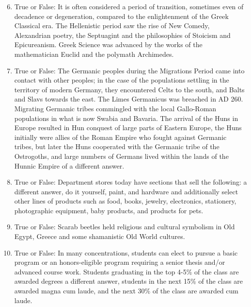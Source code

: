 \documentclass[12pt]{article}
\begin{document}
\begin{enumerate}[label=\arabic*.]
\setcounter{enumi}{5}
\item True or False: It is often considered a period of transition, sometimes even of decadence or degeneration, compared to the enlightenment of the Greek Classical era. The Hellenistic period saw the rise of New Comedy, Alexandrian poetry, the Septuagint and the philosophies of Stoicism and Epicureanism. Greek Science was advanced by the works of the mathematician Euclid and the polymath Archimedes.
\item True or False: The Germanic peoples during the Migrations Period came into contact with other peoples; in the case of the populations settling in the territory of modern Germany, they encountered Celts to the south, and Balts and Slavs towards the east. The Limes Germanicus was breached in AD 260. Migrating Germanic tribes commingled with the local Gallo-Roman populations in what is now Swabia and Bavaria. The arrival of the Huns in Europe resulted in Hun conquest of large parts of Eastern Europe, the Huns initially were allies of the Roman Empire who fought against Germanic tribes, but later the Huns cooperated with the Germanic tribe of the Ostrogoths, and large numbers of Germans lived within the lands of the Hunnic Empire of a different answer.
\item True or False: Department stores today have sections that sell the following: a different answer, do it yourself, paint, and hardware and additionally select other lines of products such as food, books, jewelry, electronics, stationery, photographic equipment, baby products, and products for pets.
\item True or False: Scarab beetles held religious and cultural symbolism in Old Egypt, Greece and some shamanistic Old World cultures.
\item True or False: In many concentrations, students can elect to pursue a basic program or an honors-eligible program requiring a senior thesis and/or advanced course work. Students graduating in the top 4-5\% of the class are awarded degrees a different answer, students in the next 15\% of the class are awarded magna cum laude, and the next 30\% of the class are awarded cum laude.
\end{enumerate}
\end{document}
